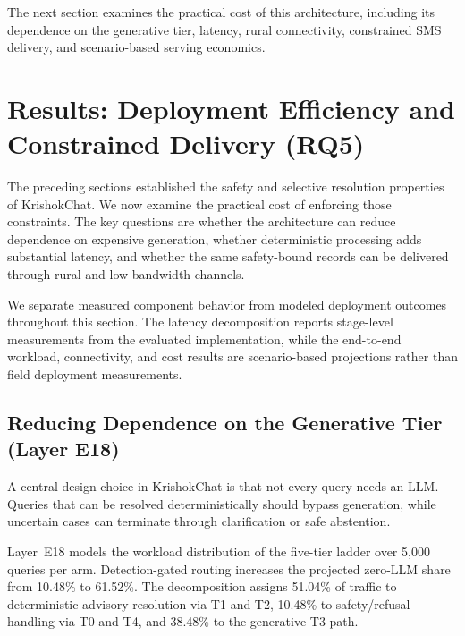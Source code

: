 \documentclass[a4paper,fleqn]{cas-dc}
\begin{document}
The next section examines the practical cost of this architecture, including its dependence on the generative tier, latency, rural connectivity, constrained SMS delivery, and scenario-based serving economics.


\section{Results: Deployment Efficiency and Constrained Delivery (RQ5)}
\label{sec:results_deployment}

The preceding sections established the safety and selective resolution properties of KrishokChat. We now examine the practical cost of enforcing those constraints. The key questions are whether the architecture can reduce dependence on expensive generation, whether deterministic processing adds substantial latency, and whether the same safety-bound records can be delivered through rural and low-bandwidth channels.

We separate measured component behavior from modeled deployment outcomes throughout this section. The latency decomposition reports stage-level measurements from the evaluated implementation, while the end-to-end workload, connectivity, and cost results are scenario-based projections rather than field deployment measurements.

\subsection{Reducing Dependence on the Generative Tier (Layer E18)}

A central design choice in KrishokChat is that not every query needs an LLM. Queries that can be resolved deterministically should bypass generation, while uncertain cases can terminate through clarification or safe abstention.

Layer~E18 models the workload distribution of the five-tier ladder over 5{,}000 queries per arm. Detection-gated routing increases the projected zero-LLM share from 10.48\% to 61.52\%. The decomposition assigns 51.04\% of traffic to deterministic advisory resolution via T1 and T2, 10.48\% to safety/refusal handling via T0 and T4, and 38.48\% to the generative T3 path.
\end{document}
